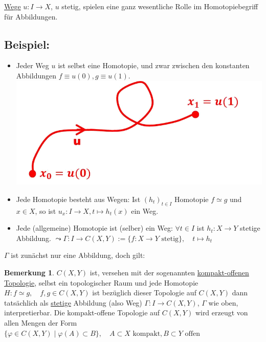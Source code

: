 \documentclass[a4paper,11pt,notitlepage]{report}
\theoremstyle{definition}
\newtheorem{remark}{Bemerkung}[chapter]
\newenvironment{bsp}[1]
{
\setlength{\fboxsep}{10pt}
\subsection*{Beispiel: #1}
\begin{upshape}
}
{
\end{upshape}
}
\begin{document}
\underline{Wege} $u \colon I \rightarrow X$, $u$ stetig, spielen eine ganz wesentliche Rolle im Homotopiebegriff für Abbildungen.

\begin{bsp}{}
	\begin{itemize}
		\item Jeder Weg $u$ ist selbst eine Homotopie, und zwar zwischen den konstanten Abbildungen $f \equiv u(0), g \equiv u(1)$.
			\newline \includegraphics[scale=0.4]{images/Weg_als_Homotopie.png}
		\item Jede Homotopie besteht aus Wegen:
			\newline Ist $(h_t)_{t \in I}$ Homotopie $f \simeq g$ und $x \in X$, so ist 
			$u_x \colon I \rightarrow X, t \mapsto h_t(x)$ ein Weg.
		\item Jede (allgemeine) Homotopie ist (selber) ein Weg: \newline
		$\forall t \in I$ ist $h_t \colon X \rightarrow Y$ stetige Abbildung.
		\newline
		$\leadsto \Gamma \colon I \rightarrow C(X,Y) := \{f \colon X \rightarrow Y \text{ stetig}\}, \quad t \mapsto h_t$
	\end{itemize}
	$\Gamma$ ist zunächst nur eine Abbildung, doch gilt:
	\begin{remark}{}
	$C(X,Y)$ ist, versehen mit der sogenannten \underline{kompakt-offenen} \underline{Topologie}, selbst ein topologischer Raum und jede Homotopie $H \colon f \simeq g, \quad f,g \in C(X,Y)$ ist bezüglich dieser Topologie auf $C(X,Y)$ dann tatsächlich als \underline{stetige} Abbildung (also Weg) $\Gamma \colon I \rightarrow C(X,Y)$, $\Gamma$ wie oben, interpretierbar.
\newline
Die kompakt-offene Topologie auf $C(X,Y)$ wird erzeugt von allen Mengen der Form $\{\varphi \in C(X,Y) \mid \varphi(A) \subset B\}, \quad A \subset X \text{ kompakt}, B \subset Y \text{ offen}$
\end{remark}

\end{bsp}
\end{document}
